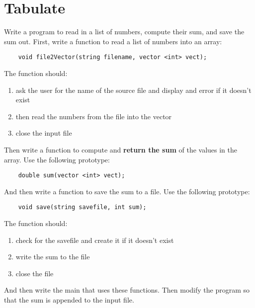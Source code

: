 \documentclass{article}
\begin{document}
\section{Tabulate}
Write a program to read in a list of numbers, compute their sum, and save the sum out. First, write a function to read a list of numbers into an array:
\begin{verbatim}
	void file2Vector(string filename, vector <int> vect);
\end{verbatim}
The function should:
\begin{enumerate}
	\item ask the user for the name of the source file and display and error if it doesn't exist
	\item then read the numbers from the file into the vector
	\item close the input file
\end{enumerate}
Then write a function to compute and \textbf{return the sum} of the values in the array. Use the following prototype:
\begin{lstlisting}
	double sum(vector <int> vect);
\end{lstlisting}
And then write a function to save the sum to a file. Use the following prototype:
\begin{verbatim}
	void save(string savefile, int sum);
\end{verbatim}
The function should:
\begin{enumerate}
	\item check for the savefile and create it if it doesn't exist
	\item write the sum to the file
	\item close the file
\end{enumerate}
And then write the main that uses these functions. 
Then modify the program so that the sum is appended to the input file.
\end{document}

